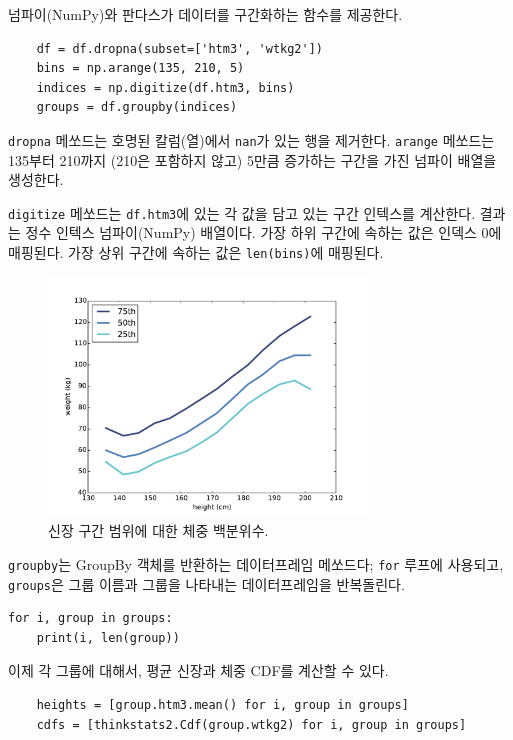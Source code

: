 넘파이(NumPy)와 판다스가 데이터를 구간화하는 함수를 제공한다.

\begin{verbatim}
    df = df.dropna(subset=['htm3', 'wtkg2'])
    bins = np.arange(135, 210, 5)
    indices = np.digitize(df.htm3, bins)
    groups = df.groupby(indices)
\end{verbatim}

{\tt dropna} 메쏘드는 호명된 칼럼(열)에서 {\tt nan}가 있는 행을 제거한다. 
{\tt arange} 메쏘드는 135부터 210까지 (210은 포함하지 않고) 5만큼 증가하는 구간을 가진 넘파이 배열을 생성한다.


{\tt digitize} 메쏘드는 {\tt df.htm3}에 있는 각 값을 담고 있는 구간 인텍스를 계산한다.
결과는 정수 인텍스 넘파이(NumPy) 배열이다. 
가장 하위 구간에 속하는 값은 인덱스 0에 매핑된다. 가장 상위 구간에 속하는 값은 {\tt len(bins)}에 매핑된다.

\begin{figure}
\centerline{\includegraphics[height=2.5in]{figs/scatter3.pdf}}
\caption{신장 구간 범위에 대한 체중 백분위수.}
\label{scatter3}
\end{figure}

{\tt groupby}는 GroupBy 객체를 반환하는 데이터프레임 메쏘드다;
{\tt for} 루프에 사용되고, {\tt groups}은 그룹 이름과 그룹을 나타내는 데이터프레임을 반복돌린다.

\begin{verbatim}
for i, group in groups:
    print(i, len(group))
\end{verbatim}

이제 각 그룹에 대해서, 평균 신장과 체중 CDF를 계산할 수 있다.

\begin{verbatim}
    heights = [group.htm3.mean() for i, group in groups]
    cdfs = [thinkstats2.Cdf(group.wtkg2) for i, group in groups]
\end{verbatim}

